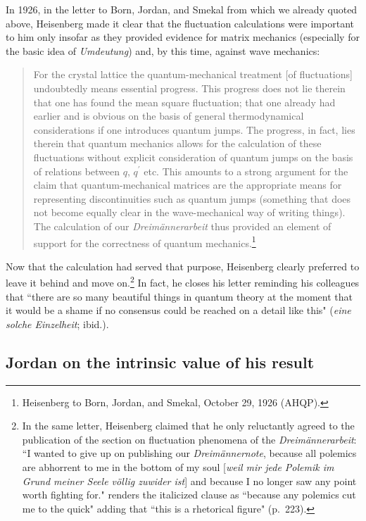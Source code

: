 \documentclass{elsart}
\begin{document}
In 1926, in the letter to Born, Jordan, and Smekal from which we already quoted above, Heisenberg made it clear that the fluctuation calculations were important to him only insofar as they provided evidence for matrix mechanics (especially for the basic idea of {\it Umdeutung}) and, by this time, against wave mechanics:
\begin{quotation}
For the crystal lattice the quantum-mechanical treatment [of fluctuations] undoubtedly means essential progress. This progress does not lie therein that one has found the mean square fluctuation; that one already had earlier and is obvious on the basis of general thermodynamical considerations if one introduces quantum jumps. The progress, in fact, lies therein that quantum mechanics allows for the calculation of these fluctuations without explicit consideration of quantum jumps on the basis of relations between $q$, $q^\prime$ etc. This amounts to a strong argument for the claim that quantum-mechanical matrices are the appropriate means for representing discontinuities such as quantum jumps (something that does not become equally clear in the wave-mechanical way of writing things). The calculation of our {\it Dreim\"annerarbeit} thus provided an element of support for the correctness of quantum mechanics.\footnote{Heisenberg to Born, Jordan, and Smekal, October 29, 1926 (AHQP).}
\end{quotation} 
Now that the calculation had served that purpose, Heisenberg clearly preferred to leave it behind and move on.\footnote{In the same letter, Heisenberg claimed that he only reluctantly agreed to the publication of the section on fluctuation phenomena of the {\it Dreim\"annerarbeit}:
``I wanted to give up on publishing our  {\it Dreim\"annernote}, because all polemics are abhorrent to me in the bottom of my soul [{\it weil mir jede Polemik im Grund meiner Seele v\"ollig zuwider ist}] and because I no longer saw any point worth fighting for." \citet{Darrigol 1986} renders the  italicized clause as ``because any polemics cut me to the quick" adding that  ``this is a rhetorical figure" (p.\ 223).} In fact, he closes his letter reminding his colleagues that ``there are so many beautiful things in quantum theory at the moment that it would be a shame if no consensus could be reached on a detail like this" ({\it eine solche Einzelheit}; ibid.). 

\subsection{Jordan on the intrinsic value of his result}
\end{document}
